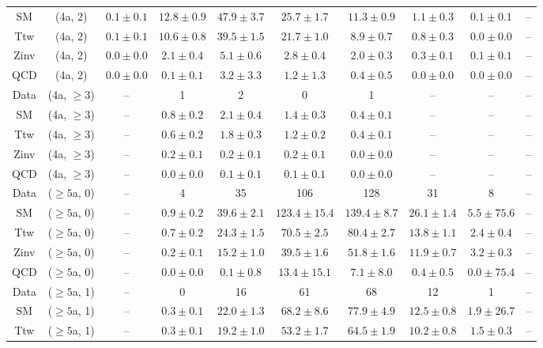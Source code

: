 \begin{table}[h!]
{\begin{tabular}{cccccccccc}
	SM & (4a, 2) & $0.1\pm 0.1$ & $12.8\pm 0.9$ & $47.9\pm 3.7$ & $25.7\pm 1.7$ & $11.3\pm 0.9$ & $1.1\pm 0.3$ & $0.1\pm 0.1$ & -- \\[0.5ex] 
	Ttw & (4a, 2) & $0.1\pm 0.1$ & $10.6\pm 0.8$ & $39.5\pm 1.5$ & $21.7\pm 1.0$ & $8.9\pm 0.7$ & $0.8\pm 0.3$ & $0.0\pm 0.0$ & -- \\[0.5ex] 
	Zinv & (4a, 2) & $0.0\pm 0.0$ & $2.1\pm 0.4$ & $5.1\pm 0.6$ & $2.8\pm 0.4$ & $2.0\pm 0.3$ & $0.3\pm 0.1$ & $0.1\pm 0.1$ & -- \\[0.5ex] 
	QCD & (4a, 2) & $0.0\pm 0.0$ & $0.1\pm 0.1$ & $3.2\pm 3.3$ & $1.2\pm 1.3$ & $0.4\pm 0.5$ & $0.0\pm 0.0$ & $0.0\pm 0.0$ & -- \\[0.5ex] 
	Data & (4a, $\ge3$) & -- & 1 & 2 & 0 & 1 & -- & -- & -- \\[0.5ex] 
	SM & (4a, $\ge3$) & -- & $0.8\pm 0.2$ & $2.1\pm 0.4$ & $1.4\pm 0.3$ & $0.4\pm 0.1$ & -- & -- & -- \\[0.5ex] 
	Ttw & (4a, $\ge3$) & -- & $0.6\pm 0.2$ & $1.8\pm 0.3$ & $1.2\pm 0.2$ & $0.4\pm 0.1$ & -- & -- & -- \\[0.5ex] 
	Zinv & (4a, $\ge3$) & -- & $0.2\pm 0.1$ & $0.2\pm 0.1$ & $0.2\pm 0.1$ & $0.0\pm 0.0$ & -- & -- & -- \\[0.5ex] 
	QCD & (4a, $\ge3$) & -- & $0.0\pm 0.0$ & $0.1\pm 0.1$ & $0.1\pm 0.1$ & $0.0\pm 0.0$ & -- & -- & -- \\[0.5ex] 
	Data & ($\ge5$a, 0) & -- & 4 & 35 & 106 & 128 & 31 & 8 & -- \\[0.5ex] 
	SM & ($\ge5$a, 0) & -- & $0.9\pm 0.2$ & $39.6\pm 2.1$ & $123.4\pm 15.4$ & $139.4\pm 8.7$ & $26.1\pm 1.4$ & $5.5\pm 75.6$ & -- \\[0.5ex] 
	Ttw & ($\ge5$a, 0) & -- & $0.7\pm 0.2$ & $24.3\pm 1.5$ & $70.5\pm 2.5$ & $80.4\pm 2.7$ & $13.8\pm 1.1$ & $2.4\pm 0.4$ & -- \\[0.5ex] 
	Zinv & ($\ge5$a, 0) & -- & $0.2\pm 0.1$ & $15.2\pm 1.0$ & $39.5\pm 1.6$ & $51.8\pm 1.6$ & $11.9\pm 0.7$ & $3.2\pm 0.3$ & -- \\[0.5ex] 
	QCD & ($\ge5$a, 0) & -- & $0.0\pm 0.0$ & $0.1\pm 0.8$ & $13.4\pm 15.1$ & $7.1\pm 8.0$ & $0.4\pm 0.5$ & $0.0\pm 75.4$ & -- \\[0.5ex] 
	Data & ($\ge5$a, 1) & -- & 0 & 16 & 61 & 68 & 12 & 1 & -- \\[0.5ex] 
	SM & ($\ge5$a, 1) & -- & $0.3\pm 0.1$ & $22.0\pm 1.3$ & $68.2\pm 8.6$ & $77.9\pm 4.9$ & $12.5\pm 0.8$ & $1.9\pm 26.7$ & -- \\[0.5ex] 
	Ttw & ($\ge5$a, 1) & -- & $0.3\pm 0.1$ & $19.2\pm 1.0$ & $53.2\pm 1.7$ & $64.5\pm 1.9$ & $10.2\pm 0.8$ & $1.5\pm 0.3$ & -- \\[0.5ex] 

\end{tabular}}
\end{table}
